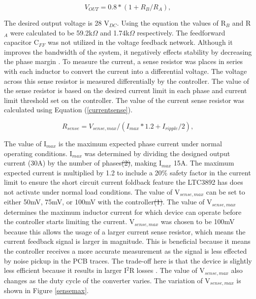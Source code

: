 \documentclass[11pt]{article}
\providecommand{\DIFdel}[1]{{\protect\color{red}\sout{#1}}}                      %
\providecommand{\DIFdelbegin}{} %
\providecommand{\DIFdelend}{} %
\newcommand{\DIFscaledelfig}{0.5}
\newlength{\DIFdelgraphicswidth} %
\newlength{\DIFdelgraphicsheight} %
\newcommand{\DIFdelincludegraphics}[2][]{%
\sbox{\DIFdelgraphicsbox}{\DIFOincludegraphics[#1]{#2}}%
\settoboxwidth{\DIFdelgraphicswidth}{\DIFdelgraphicsbox} %
\settoboxtotalheight{\DIFdelgraphicsheight}{\DIFdelgraphicsbox} %
\scalebox{\DIFscaledelfig}{%
\parbox[b]{\DIFdelgraphicswidth}{\usebox{\DIFdelgraphicsbox}\\[-\baselineskip] \rule{\DIFdelgraphicswidth}{0em}}\llap{\resizebox{\DIFdelgraphicswidth}{\DIFdelgraphicsheight}{%
\setlength{\unitlength}{\DIFdelgraphicswidth}%
\begin{picture}(1,1)%
\thicklines\linethickness{2pt} %
{\color[rgb]{1,0,0}\put(0,0){\framebox(1,1){}}}%
{\color[rgb]{1,0,0}\put(0,0){\line( 1,1){1}}}%
{\color[rgb]{1,0,0}\put(0,1){\line(1,-1){1}}}%
\end{picture}%
}\hspace*{3pt}}} %
} %
\DeclareRobustCommand{\DIFdelbegin}{\DIFOdelbegin \let\includegraphics\DIFdelincludegraphics} %
\DeclareRobustCommand{\DIFdelend}{\DIFOaddend \let\includegraphics\DIFOincludegraphics} %
\begin{document}
    \begin{equation}
        V_{OUT} = 0.8*(1+R_B/R_A),
        \label{vfbeq}
    \end{equation}

    \noindent The desired output voltage is 28 V$_{DC}$. Using the equation the values of R$_B$ and R$_A$ were calculated to be 59.2k$\Omega$ and 1.74k$\Omega$ respectively. The feedforward capacitor C$_{FF}$ was not utilized in the voltage feedback network. Although it improves the bandwidth of the system, it negatively effects stability by decreasing the phase margin \cite{linear_technology_ltc3892:_nodate}.
    \newline
    \newline
    \noindent To measure the current, a sense resistor was places in series with each inductor to convert the current into a differential voltage. The voltage across this sense resistor is measured differentially by the controller. The value of the sense resistor is based on the desired current limit in each phase and current limit threshold set on the controller. The value of the current sense resistor was calculated using Equation (\ref{currentsense}).

    \begin{equation}
        R_{sense}=V_{sense,max}/(I_{max}*1.2+I_{ripple}/2),
        \label{currentsense}
    \end{equation}

    \noindent The value of I$_{max}$ is the maximum expected phase current under normal operating conditions. I$_{max}$ was determined by dividing the designed output current (30A) by the number of phases\DIFdelbegin \DIFdel{(2)}\DIFdelend , making I$_{max}$ 15A. The maximum expected current is multiplied by 1.2 to include a 20$\%$ safety factor in the current limit to ensure the short circuit current foldback feature the LTC3892 has does not activate under normal load conditions. 
    The value of V$_{sense,max}$ can be set to either 50mV, 75mV, or 100mV with the controller\DIFdelbegin \DIFdel{(1)}\DIFdelend . The value of V$_{sense,max}$ determines the maximum inductor current for which device can operate before the controller starts limiting the current. V$_{sense,max}$ was chosen to be 100mV because this allows the usage of a larger current sense resistor, which means the current feedback signal is larger in magnitude. This is beneficial because it means the controller receives a more accurate measurement as the signal is less effected by noise pickup in the PCB traces. The trade-off here is that the device is slightly less efficient because it results in larger I$^2$R losses \cite{linear_technology_ltc3892:_nodate}.
    \newline
    \newline
    \noindent The value of V$_{sense,max}$ also changes as the duty cycle of the converter varies. The variation of V$_{sense,max}$ is shown in Figure \ref{sensemax}.
\end{document}
